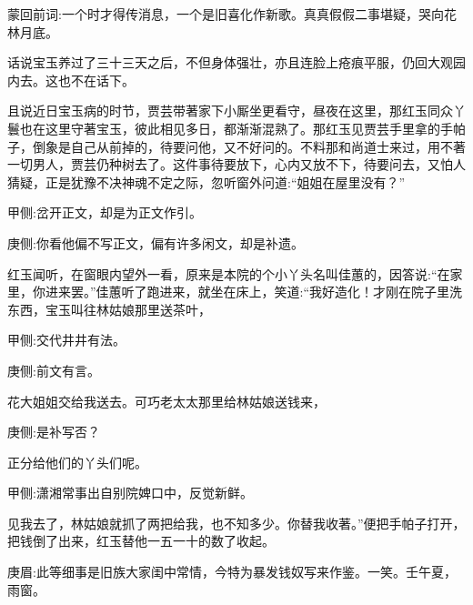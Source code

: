 

\begin{parag}
    \begin{note}蒙回前词:一个时才得传消息，一个是旧喜化作新歌。真真假假二事堪疑，哭向花林月底。\end{note}
\end{parag}


\begin{parag}
    话说宝玉养过了三十三天之后，不但身体强壮，亦且连脸上疮痕平服，仍回大观园内去。这也不在话下。
\end{parag}


\begin{parag}
    且说近日宝玉病的时节，贾芸带著家下小厮坐更看守，昼夜在这里，那红玉同众丫鬟也在这里守著宝玉，彼此相见多日，都渐渐混熟了。那红玉见贾芸手里拿的手帕子，倒象是自己从前掉的，待要问他，又不好问的。不料那和尚道士来过，用不著一切男人，贾芸仍种树去了。这件事待要放下，心内又放不下，待要问去，又怕人猜疑，正是犹豫不决神魂不定之际，忽听窗外问道:“姐姐在屋里没有？”\begin{note}甲侧:岔开正文，却是为正文作引。\end{note}\begin{note}庚侧:你看他偏不写正文，偏有许多闲文，却是补遗。\end{note}红玉闻听，在窗眼内望外一看，原来是本院的个小丫头名叫佳蕙的，因答说:“在家里，你进来罢。”佳蕙听了跑进来，就坐在床上，笑道:“我好造化！才刚在院子里洗东西，宝玉叫往林姑娘那里送茶叶，\begin{note}甲侧:交代井井有法。\end{note}\begin{note}庚侧:前文有言。\end{note}花大姐姐交给我送去。可巧老太太那里给林姑娘送钱来，\begin{note}庚侧:是补写否？\end{note}正分给他们的丫头们呢。\begin{note}甲侧:潇湘常事出自别院婢口中，反觉新鲜。\end{note}见我去了，林姑娘就抓了两把给我，也不知多少。你替我收著。”便把手帕子打开，把钱倒了出来，红玉替他一五一十的数了收起。\begin{note}庚眉:此等细事是旧族大家闺中常情，今特为暴发钱奴写来作鉴。一笑。壬午夏，雨窗。\end{note}
\end{parag}


